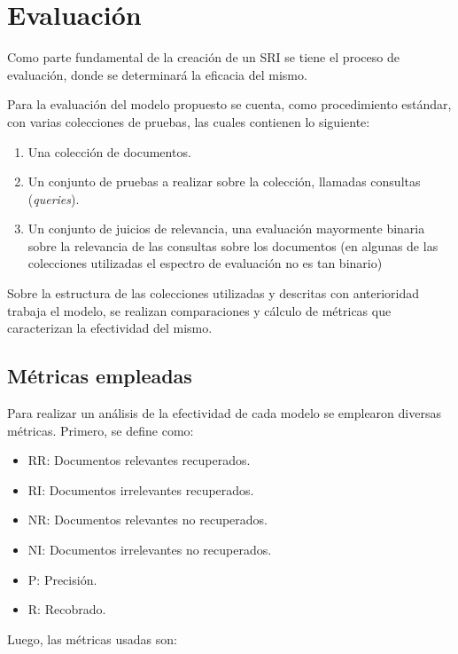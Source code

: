 \section{Evaluación}\label{sec:eval}

Como parte fundamental de la creación de un SRI se tiene el proceso de
evaluación, donde se determinará la eficacia del mismo.

Para la evaluación del modelo propuesto se cuenta, como procedimiento estándar,
con varias colecciones de pruebas, las cuales contienen lo siguiente:

\begin{enumerate}
    \item Una colección de documentos.
    \item Un conjunto de pruebas a realizar sobre la colección, llamadas
    consultas (\emph{queries}).
    \item Un conjunto de juicios de relevancia, una evaluación mayormente
    binaria sobre la relevancia de las consultas sobre los documentos (en
    algunas de las colecciones utilizadas el espectro de evaluación no es tan
    binario) 
\end{enumerate}

Sobre la estructura de las colecciones utilizadas y descritas con anterioridad
trabaja el modelo, se realizan comparaciones y cálculo de métricas que
caracterizan la efectividad del mismo.

\subsection{Métricas empleadas}\label{sec:metrics}

Para realizar un análisis de la efectividad de cada modelo se emplearon 
diversas métricas. Primero, se define como:

\begin{itemize}
	\item RR: Documentos relevantes recuperados.
	\item RI: Documentos irrelevantes recuperados.
	\item NR: Documentos relevantes no recuperados.
	\item NI: Documentos irrelevantes no recuperados.
	\item P: Precisión.
	\item R: Recobrado.
\end{itemize}

Luego, las métricas usadas son:

